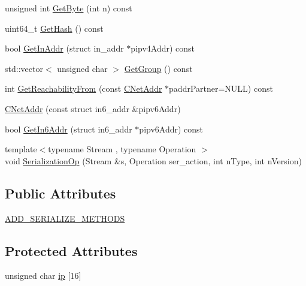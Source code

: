 \begin{DoxyCompactItemize}
unsigned int \mbox{\hyperlink{class_c_net_addr_acfd51ebf2030b01fa5ac133176512475}{Get\+Byte}} (int n) const
\item 
uint64\+\_\+t \mbox{\hyperlink{class_c_net_addr_a8fae7d32e83e9fbb9ce0216f896133c9}{Get\+Hash}} () const
\item 
bool \mbox{\hyperlink{class_c_net_addr_a4f73432c55d4acb6b9e4c54833eefea6}{Get\+In\+Addr}} (struct in\+\_\+addr $\ast$pipv4\+Addr) const
\item 
std\+::vector$<$ unsigned char $>$ \mbox{\hyperlink{class_c_net_addr_a6f8211515f809f6972ce327433d41458}{Get\+Group}} () const
\item 
int \mbox{\hyperlink{class_c_net_addr_aa68c7d6112b22759dcd280ddad30808f}{Get\+Reachability\+From}} (const \mbox{\hyperlink{class_c_net_addr}{C\+Net\+Addr}} $\ast$paddr\+Partner=N\+U\+LL) const
\item 
\mbox{\hyperlink{class_c_net_addr_a9eae4232457f7659a157467274d1b444}{C\+Net\+Addr}} (const struct in6\+\_\+addr \&pipv6\+Addr)
\item 
bool \mbox{\hyperlink{class_c_net_addr_a3616012f94b27148e5b8e27d943d4884}{Get\+In6\+Addr}} (struct in6\+\_\+addr $\ast$pipv6\+Addr) const
\item 
{\footnotesize template$<$typename Stream , typename Operation $>$ }\\void \mbox{\hyperlink{class_c_net_addr_a7c914d155a533f64f8aa0d2f9bfff8a7}{Serialization\+Op}} (Stream \&s, Operation ser\+\_\+action, int n\+Type, int n\+Version)
\end{DoxyCompactItemize}
\subsection*{Public Attributes}
\begin{DoxyCompactItemize}
\item 
\mbox{\hyperlink{class_c_net_addr_ab08e22719f96b42c61e998158a895e5f}{A\+D\+D\+\_\+\+S\+E\+R\+I\+A\+L\+I\+Z\+E\+\_\+\+M\+E\+T\+H\+O\+DS}}
\end{DoxyCompactItemize}
\subsection*{Protected Attributes}
\begin{DoxyCompactItemize}
\item 
unsigned char \mbox{\hyperlink{class_c_net_addr_acff7ce68f33f8dfbfe6d79d80928d417}{ip}} \mbox{[}16\mbox{]}
\end{DoxyCompactItemize}
